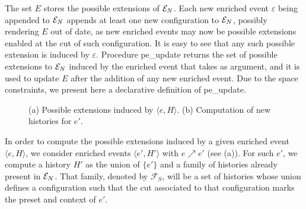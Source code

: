 \documentclass[11pt,a4paper]{article}
\newcommand{\peupdate}{\mbox{\sf pe\_update}}
\begin{document}
The set $E$ stores the possible extensions of $\mathcal{E}_{N}$.  Each new enriched
event $\varepsilon$ being appended to $\mathcal{E}_{N}$ appends at least one new
configuration to $\mathcal{E}_{N}$, possibly rendering $E$ out of date, as new enriched
events may now be possible extensions enabled at the cut of such configuration.
It is easy to see that any such possible extension is induced by $\varepsilon$.
Procedure \peupdate{} returns the set of possible extensions to $\mathcal{E}_{N}$
induced by the enriched event that takes as argument, and it is used to update
$E$ after the addition of any new enriched event.  Due to the space
constraints, we present here a declarative definition of \peupdate{}.  

\begin{figure}[b]
\caption{(a) Possible extensions induced by $\langle e, H \rangle$. (b)
Computation of new histories for $e'$.}
\label{fig:discovery.possible}
\end{figure}

In order to compute the possible extensions induced by a given enriched event
$\langle e, H \rangle$, we consider enriched events $\langle e', H' \rangle$
with $e \nearrow e'$ (see  (a)).  For such $e'$, we
compute a history $H'$ as the union of $\{e'\}$ and a family of histories
already present in $\mathcal{E}_{N}$.  That family, denoted by $\mathcal{F}_S$, will be
a set of histories whose union defines a configuration such that the cut
associated to that configuration marks the preset and context of $e'$.
\end{document}
